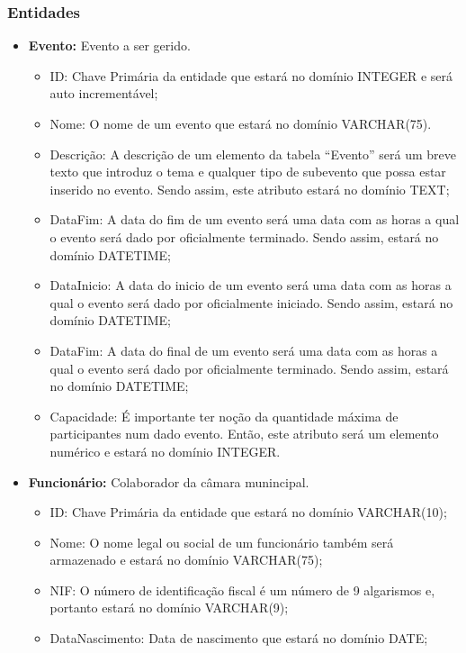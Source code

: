 \documentclass[a4paper,12pt]{scrreprt}
\begin{document}
             \subsubsection{Entidades}
             \begin{itemize}
                 \item{\textbf{Evento:}} Evento a ser gerido. 
                     \begin{itemize}
                     \item{ID:} Chave Primária da entidade que estará no domínio INTEGER
                       e será auto incrementável;
                     \item{Nome:} O nome de um evento que estará no domínio VARCHAR(75).
                     \item{Descrição:} A descrição de um elemento da tabela ``Evento'' será
                       um breve texto que introduz o tema e qualquer tipo de subevento que possa
                       estar inserido no evento. Sendo assim, este atributo estará no domínio TEXT;
                     \item{DataFim:} A data do fim de um evento será uma data com as horas a qual
                       o evento será dado por oficialmente terminado. Sendo assim, estará no domínio
                       DATETIME;
                     \item{DataInicio:} A data do inicio de um evento será uma data com as horas a qual
                       o evento será dado por oficialmente iniciado. Sendo assim, estará no domínio
                       DATETIME;
                     \item{DataFim:} A data do final de um evento será uma data com as horas a qual
                       o evento será dado por oficialmente terminado. Sendo assim, estará no domínio
                       DATETIME;
                     \item{Capacidade:} É importante ter noção da quantidade máxima de participantes num
                       dado evento. Então, este atributo será um elemento numérico e estará no domínio INTEGER.
                     \end{itemize}
                 \item{\textbf{Funcionário:}} Colaborador da câmara munincipal.
                     \begin{itemize}
                     \item{ID:} Chave Primária da entidade que estará no domínio VARCHAR(10);
                     \item{Nome:} O nome legal ou social de um funcionário também será armazenado e estará
                       no domínio VARCHAR(75);
                     \item{NIF:} O número de identificação fiscal é um número de 9 algarismos e, portanto estará
                       no domínio VARCHAR(9);
                     \item{DataNascimento:} Data de nascimento que estará no domínio DATE;
                       

\end{itemize}
\end{itemize}
\end{document}
